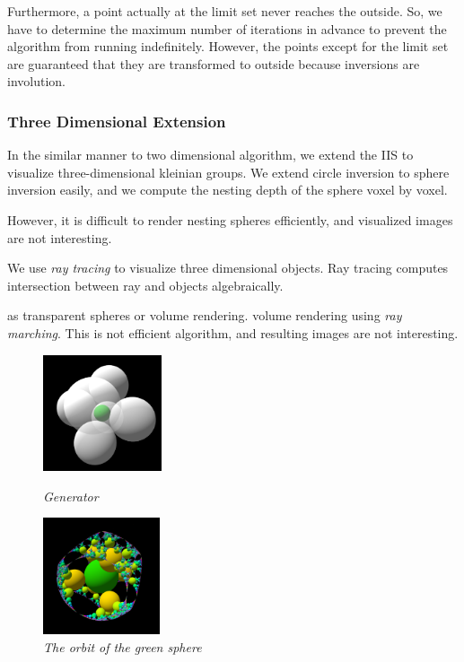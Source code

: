 Furthermore, a point actually at the limit set never reaches the
outside. So, we have to determine the maximum number of iterations in
advance to prevent the algorithm from running indeﬁnitely.
However, the points except for the limit set are guaranteed that they
are transformed to outside because inversions are involution.

\subsubsection{Three Dimensional Extension}


In the similar manner to two dimensional algorithm,
we extend the IIS to visualize three-dimensional kleinian groups.
We extend circle inversion to sphere inversion easily, and we
compute the nesting depth of the sphere voxel by voxel.

However, it is difficult to render nesting spheres efficiently, and
visualized images are not interesting.

We use \textit{ray tracing} to visualize three dimensional objects.
Ray tracing computes intersection between ray and objects algebraically.

as transparent spheres or volume rendering.
volume rendering using \textit{ray marching}.
This is not efficient algorithm, and resulting images are not interesting.

\begin{figure}[htbp]
 \begin{minipage}[t]{0.5\hsize}
  \center
  \includegraphics[height=1.35in, keepaspectratio]{img/preparation/3dExtension/3dKissingGenerator.png}
  \caption{\textit{Generator}}
  \label{fig:cayleyGraph}
  \hspace*{\fill}
 \end{minipage}
 \begin{minipage}[t]{0.5\hsize}
  \center
  \includegraphics[height=1.35in, keepaspectratio]{img/preparation/3dExtension/3dOrbit.png}
  \caption{\textit{The orbit of the green sphere}}
  \label{fig:orbitCat}
  \hspace*{\fill}
 \end{minipage}
\end{figure}

